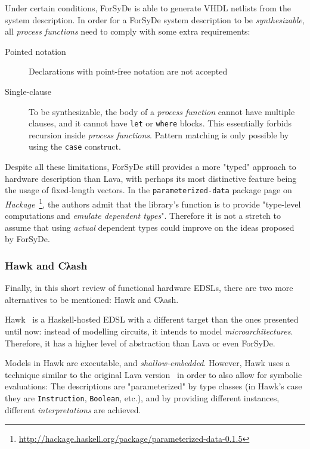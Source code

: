             Under certain conditions, ForSyDe is able to generate \ac{VHDL} netlists from the system description.
            In order for a ForSyDe system description to be \emph{synthesizable},
            all \emph{process functions} need to comply with some extra requirements:

            \begin{description}
                \item[Pointed notation] Declarations with point-free notation are not accepted
                \item[Single-clause] To be synthesizable,
                    the body of a \emph{process function} cannot have multiple clauses,
                    and it cannot have \texttt{let} or \texttt{where} blocks.
                    This essentially forbids recursion inside \emph{process functions}.
                    Pattern matching is only possible by using the \texttt{case} construct.
            \end{description}

            Despite all these limitations,
            ForSyDe still provides a more "typed" approach to hardware description than Lava,
            with perhaps its most distinctive feature being the usage of fixed-length vectors.
            In the \texttt{parameterized-data} package page
            on \emph{Hackage}~\footnote{\url{http://hackage.haskell.org/package/parameterized-data-0.1.5}},
            the authors admit that the library's function is to provide
            "type-level computations and \emph{emulate dependent types}".
            Therefore it is not a stretch to assume that using \emph{actual} dependent types
            could improve on the ideas proposed by ForSyDe.


            \subsubsection{Hawk and Cλash}
            Finally, in this short review of functional hardware \acp{EDSL},
            there are two more alternatives to be mentioned: Hawk and Cλash.

            Hawk~\cite{hawk-haskell} is a Haskell-hosted \ac{EDSL} with a different target than
            the ones presented until now: instead of modelling circuits, it intends to model \emph{microarchitectures}.
            Therefore, it has a higher level of abstraction than Lava or even ForSyDe.

            Models in Hawk are executable, and \emph{shallow-embedded}.
            However, Hawk uses a technique similar to the original Lava version~\cite{lava-1999}
            in order to also allow for symbolic evaluations:
            The descriptions are "parameterized" by type classes
            (in Hawk's case they are \texttt{Instruction}, \texttt{Boolean}, etc.),
            and by providing different instances, different \emph{interpretations} are achieved.

